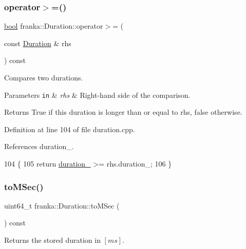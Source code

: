 \subsubsection{\texorpdfstring{operator$>$=()}{operator>=()}}
{\footnotesize\ttfamily \hyperlink{classbool}{bool} franka\+::\+Duration\+::operator$>$= (\begin{DoxyParamCaption}\item[{const \hyperlink{classfranka_1_1Duration}{Duration} \&}]{rhs }\end{DoxyParamCaption}) const\hspace{0.3cm}{\ttfamily [noexcept]}}

Compares two durations.


\begin{DoxyParams}[1]{Parameters}
\mbox{\tt in}  & {\em rhs} & Right-\/hand side of the comparison.\\
\hline
\end{DoxyParams}
\begin{DoxyReturn}{Returns}
True if this duration is longer than or equal to rhs, false otherwise. 
\end{DoxyReturn}


Definition at line 104 of file duration.\+cpp.



References duration\+\_\+.


\begin{DoxyCode}
104                                                             \{
105   \textcolor{keywordflow}{return} \hyperlink{classfranka_1_1Duration_ae446c403b200f0dbf92fb51ca21e82ff}{duration\_} >= rhs.duration\_;
106 \}
\end{DoxyCode}
\mbox{\label{classfranka_1_1Duration_a2a25ae33c8739b8f705f13798aa9e162}} 
\subsubsection{\texorpdfstring{to\+M\+Sec()}{toMSec()}}
{\footnotesize\ttfamily uint64\+\_\+t franka\+::\+Duration\+::to\+M\+Sec (\begin{DoxyParamCaption}{ }\end{DoxyParamCaption}) const\hspace{0.3cm}{\ttfamily [noexcept]}}

Returns the stored duration in $[ms]$.

